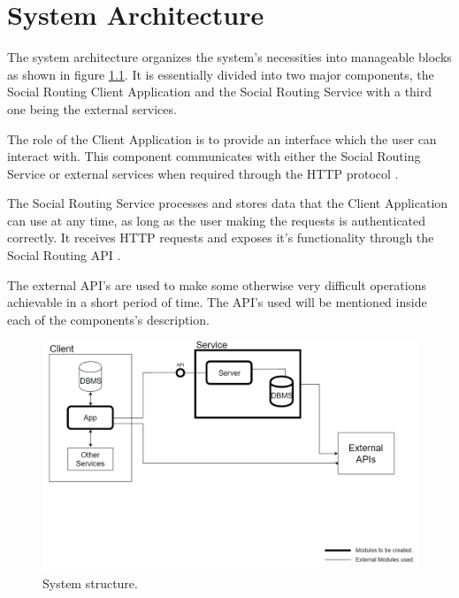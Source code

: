 \chapter{System Architecture}     
        The system architecture organizes the system's necessities into manageable blocks as shown in figure \ref{fig:systemstructure}.
        It is essentially divided into two major components, the Social Routing Client Application \cite{clientapplicationdocs} and the Social Routing Service with a third one being the external services.
        
        The role of the Client Application is to provide an interface which the user can interact with. This component communicates 
        with either the Social Routing Service or external services when required through the HTTP protocol \cite{httponlinedocs}.
        
        The Social Routing Service processes and stores data that the Client Application can use at any time, as long as the user making 
        the requests is authenticated correctly. It receives HTTP requests and exposes it's functionality through the Social Routing API \cite{apidocs}.

        The external API's are used to make some otherwise very difficult operations achievable in a short period of time. The API's
        used will be mentioned inside each of the components's description.   

        \vfill
        \begin{figure}[h]            
            \includegraphics[width=\textwidth]{images/project-structure/system-structure.PNG}
            \caption{System structure.}
            \label{fig:systemstructure}
        \end{figure}  
